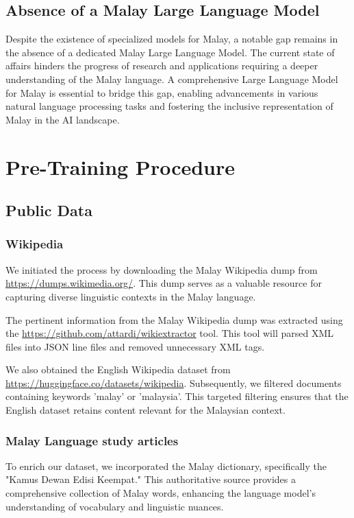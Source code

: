 \documentclass[preprint]{article}
\begin{document}
\subsection{Absence of a Malay Large Language Model}

Despite the existence of specialized models for Malay, a notable gap remains in the absence of a dedicated Malay Large Language Model. The current state of affairs hinders the progress of research and applications requiring a deeper understanding of the Malay language. A comprehensive Large Language Model for Malay is essential to bridge this gap, enabling advancements in various natural language processing tasks and fostering the inclusive representation of Malay in the AI landscape.

\section{Pre-Training Procedure}

\subsection{Public Data}

\subsubsection{Wikipedia}\label{sec:wikipedia}

We initiated the process by downloading the Malay Wikipedia dump from \url{https://dumps.wikimedia.org/}. This dump serves as a valuable resource for capturing diverse linguistic contexts in the Malay language.

The pertinent information from the Malay Wikipedia dump was extracted using the \url{https://github.com/attardi/wikiextractor} tool. This tool will parsed XML files into JSON line files and removed unnecessary XML tags.

We also obtained the English Wikipedia dataset from \url{https://huggingface.co/datasets/wikipedia}. Subsequently, we filtered documents containing keywords 'malay' or 'malaysia'. This targeted filtering ensures that the English dataset retains content relevant for the Malaysian context.

\subsubsection{Malay Language study articles}

To enrich our dataset, we incorporated the Malay dictionary, specifically the "Kamus Dewan Edisi Keempat." This authoritative source provides a comprehensive collection of Malay words, enhancing the language model's understanding of vocabulary and linguistic nuances.
\end{document}
